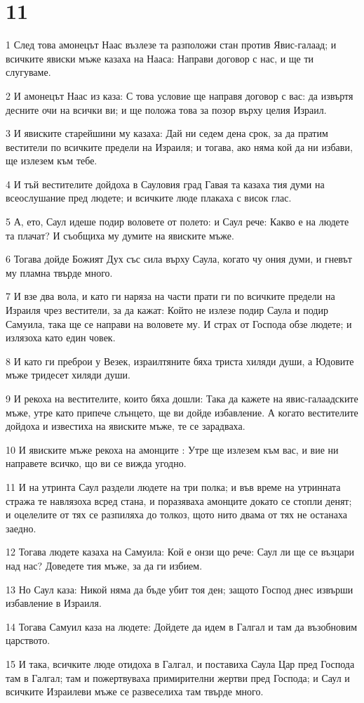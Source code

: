 \chapter{11}

\par 1 След това амонецът Наас възлезе та разположи стан против Явис-галаад; и всичките явиски мъже казаха на Нааса: Направи договор с нас, и ще ти слугуваме.
\par 2 И амонецът Наас из каза: С това условие ще направя договор с вас: да извъртя десните очи на всички ви; и ще положа това за позор върху целия Израил.
\par 3 И явиските старейшини му казаха: Дай ни седем дена срок, за да пратим вестители по всичките предели на Израиля; и тогава, ако няма кой да ни избави, ще излезем към тебе.
\par 4 И тъй вестителите дойдоха в Сауловия град Гавая та казаха тия думи на всеослушание пред людете; и всичките люде плакаха с висок глас.
\par 5 А, ето, Саул идеше подир воловете от полето: и Саул рече: Какво е на людете та плачат? И съобщиха му думите на явиските мъже.
\par 6 Тогава дойде Божият Дух със сила върху Саула, когато чу ония думи, и гневът му пламна твърде много.
\par 7 И взе два вола, и като ги наряза на части прати ги по всичките предели на Израиля чрез вестители, за да кажат: Който не излезе подир Саула и подир Самуила, така ще се направи на воловете му. И страх от Господа обзе людете; и излязоха като един човек.
\par 8 И като ги преброи у Везек, израилтяните бяха триста хиляди души, а Юдовите мъже тридесет хиляди души.
\par 9 И рекоха на вестителите, които бяха дошли: Така да кажете на явис-галаадските мъже, утре като припече слънцето, ще ви дойде избавление. А когато вестителите дойдоха и известиха на явиските мъже, те се зарадваха.
\par 10 И явиските мъже рекоха на амонците : Утре ще излезем към вас, и вие ни направете всичко, що ви се вижда угодно.
\par 11 И на утринта Саул раздели людете на три полка; и във време на утринната стража те навлязоха всред стана, и поразяваха амонците докато се стопли денят; и оцелелите от тях се разпиляха до толкоз, щото нито двама от тях не останаха заедно.
\par 12 Тогава людете казаха на Самуила: Кой е онзи що рече: Саул ли ще се възцари над нас? Доведете тия мъже, за да ги избием.
\par 13 Но Саул каза: Никой няма да бъде убит тоя ден; защото Господ днес извърши избавление в Израиля.
\par 14 Тогава Самуил каза на людете: Дойдете да идем в Галгал и там да възобновим царството.
\par 15 И така, всичките люде отидоха в Галгал, и поставиха Саула Цар пред Господа там в Галгал; там и пожертвуваха примирителни жертви пред Господа; и Саул и всичките Израилеви мъже се развеселиха там твърде много.

